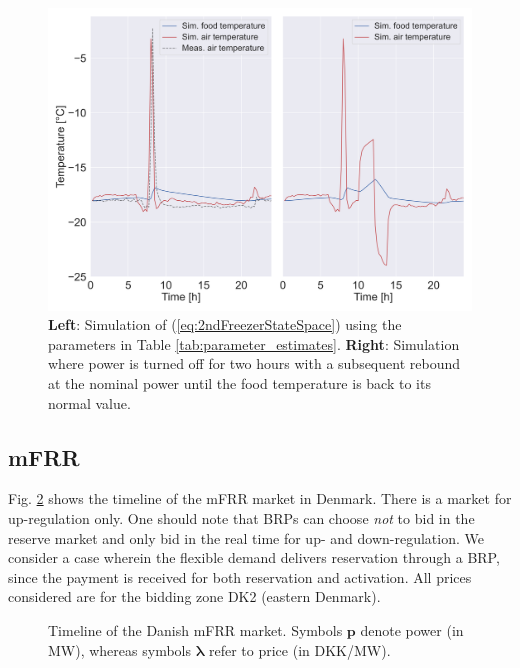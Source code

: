 \begin{figure}[!t]
    \centering
    \includegraphics[width=\columnwidth]{../figures/2ndFreezerModelSimulation.png}
    \caption{ \textbf{Left}: Simulation of (\ref{eq:2ndFreezerStateSpace}) using the parameters in Table \ref{tab:parameter_estimates}. \textbf{Right}: Simulation where power is turned off for two hours with a subsequent rebound at the nominal power until the food temperature is back to its normal value.}
    \label{fig:2ndFreezerModelSimulation}
    \vspace{-2mm}
\end{figure}

\vspace{-1mm}
\subsection{mFRR}\label{sec:mFRR}
%
Fig. \ref{fig:timeline_mfrr} shows the timeline of the mFRR market in Denmark. There is a market for up-regulation only. One should note  that BRPs can choose \textit{not} to bid in the reserve market and  only bid in the real time for up- and down-regulation. We consider a case wherein the flexible demand delivers reservation through a BRP, since the payment is received for both reservation and activation. All prices considered are for the bidding zone DK2 (eastern Denmark).


\begin{figure}[!t]
    \centering
    
    \caption{Timeline of the Danish mFRR market. Symbols $\bm{p}$ denote power (in MW), whereas symbols  $\bm{\lambda}$ refer to price (in DKK/MW).}
    \label{fig:timeline_mfrr}
    \vspace{-3mm}
\end{figure}


